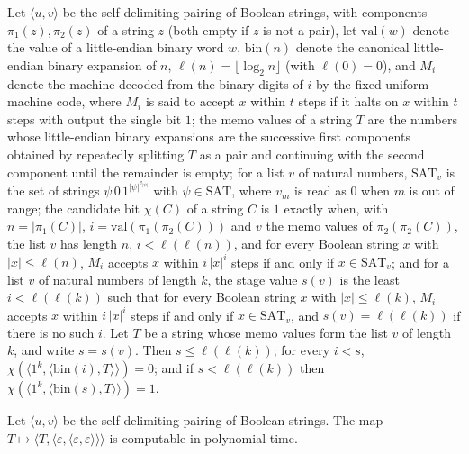 \begin{theorem}
\label{Complexity.ladner_stage_spec}
\leanok
{}
Let $\langle u,v\rangle$ be the self-delimiting pairing of Boolean strings, with components $\pi_1(z),\pi_2(z)$ of a string $z$ (both empty if $z$ is not a pair), let $\mathrm{val}(w)$ denote the value of a little-endian binary word $w$, $\mathrm{bin}(n)$ denote the canonical little-endian binary expansion of $n$, $\ell(n)=\lfloor\log_2 n\rfloor$ (with $\ell(0)=0$), and $M_i$ denote the machine decoded from the binary digits of $i$ by the fixed uniform machine code, where $M_i$ is said to accept $x$ within $t$ steps if it halts on $x$ within $t$ steps with output the single bit $1$; the memo values of a string $T$ are the numbers whose little-endian binary expansions are the successive first components obtained by repeatedly splitting $T$ as a pair and continuing with the second component until the remainder is empty; for a list $v$ of natural numbers, $\mathrm{SAT}_v$ is the set of strings $\psi\,0\,1^{|\psi|^{v_{|\psi|}}}$ with $\psi\in\mathrm{SAT}$, where $v_m$ is read as $0$ when $m$ is out of range; the candidate bit $\chi(C)$ of a string $C$ is $1$ exactly when, with $n=|\pi_1(C)|$, $i=\mathrm{val}(\pi_1(\pi_2(C)))$ and $v$ the memo values of $\pi_2(\pi_2(C))$, the list $v$ has length $n$, $i<\ell(\ell(n))$, and for every Boolean string $x$ with $|x|\le\ell(n)$, $M_i$ accepts $x$ within $i\,|x|^i$ steps if and only if $x\in\mathrm{SAT}_v$; and for a list $v$ of natural numbers of length $k$, the stage value $s(v)$ is the least $i<\ell(\ell(k))$ such that for every Boolean string $x$ with $|x|\le\ell(k)$, $M_i$ accepts $x$ within $i\,|x|^i$ steps if and only if $x\in\mathrm{SAT}_v$, and $s(v)=\ell(\ell(k))$ if there is no such $i$. Let $T$ be a
string whose memo values form the list $v$ of length $k$, and write $s=s(v)$. Then
$s\le\ell(\ell(k))$; for every $i<s$,
$\chi(\langle 1^{k},\langle\mathrm{bin}(i),T\rangle\rangle)=0$; and if $s<\ell(\ell(k))$ then
$\chi(\langle 1^{k},\langle\mathrm{bin}(s),T\rangle\rangle)=1$.
\end{theorem}

\begin{theorem}
\label{Complexity.ladner_selectInit_FP}
\leanok
{}
Let $\langle u,v\rangle$ be the self-delimiting pairing of Boolean strings. The map
$T\mapsto\langle T,\langle\varepsilon,\langle\varepsilon,\varepsilon\rangle\rangle\rangle$ is
computable in polynomial time.
\end{theorem}

